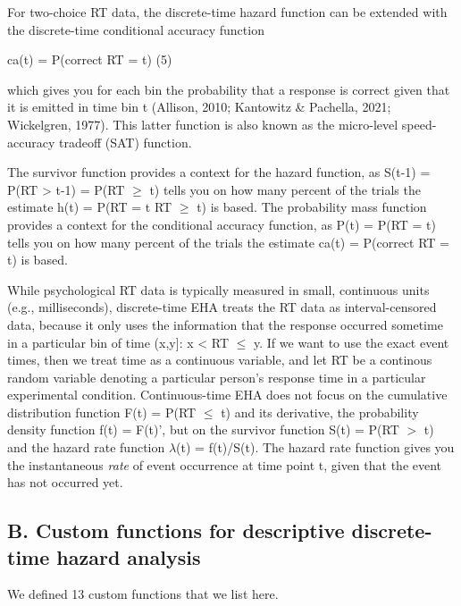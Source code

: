 \documentclass[
  man, donotrepeattitle,floatsintext]{apa6}
\begin{document}
For two-choice RT data, the discrete-time hazard function can be extended with the discrete-time conditional accuracy function

\noindent ca(t) = P(correct \textbar{} RT = t) \hfill  (5)

\noindent which gives you for each bin the probability that a response is correct given that it is emitted in time bin t (Allison, 2010; Kantowitz \& Pachella, 2021; Wickelgren, 1977). This latter function is also known as the micro-level speed-accuracy tradeoff (SAT) function.

The survivor function provides a context for the hazard function, as S(t-1) = P(RT \textgreater{} t-1) = P(RT \(\geq\) t) tells you on how many percent of the trials the estimate h(t) = P(RT = t\textbar{} RT \(\geq\) t) is based. The probability mass function provides a context for the conditional accuracy function, as P(t) = P(RT = t) tells you on how many percent of the trials the estimate ca(t) = P(correct \textbar{} RT = t) is based.

While psychological RT data is typically measured in small, continuous units (e.g., milliseconds), discrete-time EHA treats the RT data as interval-censored data, because it only uses the information that the response occurred sometime in a particular bin of time (x,y{]}: x \textless{} RT \(\leq\) y. If we want to use the exact event times, then we treat time as a continuous variable, and let RT be a continous random variable denoting a particular person's response time in a particular experimental condition. Continuous-time EHA does not focus on the cumulative distribution function F(t) = P(RT \(\leq\) t) and its derivative, the probability density function f(t) = F(t)', but on the survivor function S(t) = P(RT \(>\) t) and the hazard rate function \(\lambda\)(t) = f(t)/S(t). The hazard rate function gives you the instantaneous \emph{rate} of event occurrence at time point t, given that the event has not occurred yet.

\subsection{B. Custom functions for descriptive discrete-time hazard analysis}\label{b.-custom-functions-for-descriptive-discrete-time-hazard-analysis}

We defined 13 custom functions that we list here.
\end{document}
